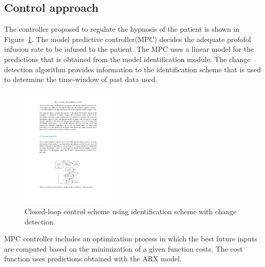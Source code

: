 \subsection{Control approach}
The controller proposed to regulate the hypnosis of the patient is shown in Figure~\ref{fig:Controller}.
%
The model predictive controller(MPC) decides the adequate profofol infusion rate to be infused to the patient.
%
The MPC uses a linear model for the predictions that is obtained from the model identification module.
%
The change detection algorithm provides information to the identification scheme that is used to determine the time-window of
past data used.
\begin{figure}[htb!]
\centering
\includegraphics[width=0.40\textwidth]{./articles/pics/aclac_paper/Controller.pdf}
\caption{Closed-loop control scheme using identification scheme with change detection.}
\label{fig:Controller}
\end{figure}
MPC controller includes an optimization process in which the best
future inputs are computed based on the minimization of a given
function costs. The cost function uses predictions obtained with the ARX model.

